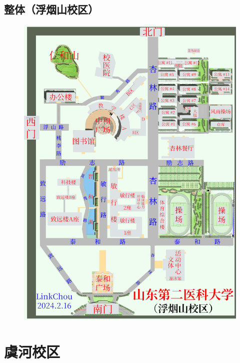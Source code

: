 \subsection[整体（浮烟山校区）]{整体（浮烟山校区）}
\noindent\begin{figure}[H]
    \centering
    \vspace{1em}
    \noindent\includegraphics*[width=.99\linewidth]{浮烟山校区整体地图.pdf}
    \label{map_a}
\end{figure}

\newpage
\section[虞河校区]{虞河校区}

